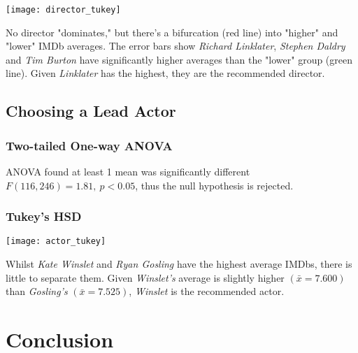 \documentclass[11pt]{article}
\begin{document}
\begin{center}
    \texttt{[image: director\_tukey]}
\end{center}

No director "dominates," but there's a bifurcation (red line) into "higher" and "lower" IMDb averages. The error bars show \textit{Richard Linklater}, \textit{Stephen Daldry} and \textit{Tim Burton} have significantly higher averages than the "lower" group (green line). Given \textit{Linklater} has the highest, they are the recommended director.

\pagebreak
\subsection{Choosing a Lead Actor}

\subsubsection{Two-tailed One-way ANOVA}

ANOVA found at least 1 mean was significantly different $F(116, 246) = 1.81,~p < 0.05$, thus the null hypothesis is rejected.

\subsubsection{Tukey's HSD}

\begin{center}
    \texttt{[image: actor\_tukey]}
\end{center}

Whilst \textit{Kate Winslet} and \textit{Ryan Gosling} have the highest average IMDbs, there is little to separate them. Given \textit{Winslet's} average is slightly higher $(\bar{x} = 7.600)$ than \textit{Gosling's} $(\bar{x} = 7.525)$, \textit{Winslet} is the recommended actor.

\pagebreak
\section{Conclusion}
\end{document}
